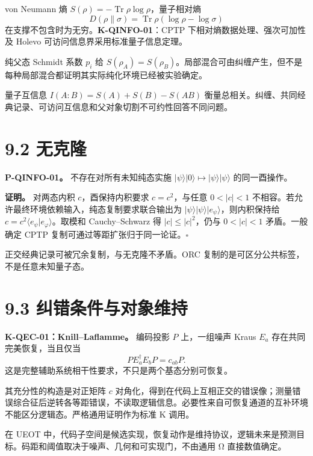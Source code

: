 \documentclass[
  11pt,
  oneside]{book}
\begin{document}
von Neumann 熵 \(S(\rho)=-\operatorname{Tr}\rho\log\rho\)，量子相对熵 \[
D(\rho\|\sigma)=\operatorname{Tr}\rho(\log\rho-\log\sigma)
\] 在支撑不包含时为无穷。\textbf{K-QINFO-01}：CPTP
下相对熵数据处理、强次可加性及 Holevo 可访问信息界采用标准量子信息定理。

纯父态 Schmidt 系数 \(p_i\) 给
\(S(\rho_A)=S(\rho_B)\)。局部混合可由纠缠产生，但不是每种局部混合都证明其实际纯化环境已经被实验确定。

量子互信息 \(I(A:B)=S(A)+S(B)-S(AB)\)
衡量总相关。纠缠、共同经典记录、可访问互信息和父对象切割不可约性回答不同问题。

\hypertarget{ux65e0ux514bux9686}{%
\section{9.2 无克隆}\label{ux65e0ux514bux9686}}

\protect\hypertarget{p-qinfo-01}{}{}

\textbf{P-QINFO-01。} 不存在对所有未知纯态实施
\(|\psi\rangle|0\rangle\mapsto|\psi\rangle|\psi\rangle\) 的同一酉操作。

\textbf{证明。} 对两态内积 \(c\)，酉保持内积要求 \(c=c^2\)，与任意
\(0<|c|<1\) 不相容。若允许最终环境依赖输入，纯态复制要求联合输出为
\(|\psi\rangle|\psi\rangle|e_\psi\rangle\)，则内积保持给
\(c=c^2\langle e_\psi|e_\varphi\rangle\)。取模和 Cauchy--Schwarz 得
\(|c|\le|c|^2\)，仍与 \(0<|c|<1\) 矛盾。一般确定 CPTP
复制可通过等距扩张归于同一论证。\(\square\)

正交经典记录可被冗余复制，与无克隆不矛盾。ORC
复制的是可区分公共标签，不是任意未知量子态。

\hypertarget{ux7ea0ux9519ux6761ux4ef6ux4e0eux5bf9ux8c61ux7ef4ux6301}{%
\section{9.3
纠错条件与对象维持}\label{ux7ea0ux9519ux6761ux4ef6ux4e0eux5bf9ux8c61ux7ef4ux6301}}

\textbf{K-QEC-01：Knill--Laflamme。} 编码投影 \(P\) 上，一组噪声 Kraus
\(E_a\) 存在共同完美恢复，当且仅当 \[
PE_a^\dagger E_bP=c_{ab}P.
\] 这是完整辅助系统相干性要求，不只是两个基态分别可恢复。

其充分性的构造是对正矩阵 \(c\)
对角化，得到在代码上互相正交的错误像；测量错误综合征后逆转各等距错误，不读取逻辑信息。必要性来自可恢复通道的互补环境不能区分逻辑态。严格通用证明作为标准
K 调用。

在 UEOT
中，代码子空间是候选实现，恢复动作是维持协议，逻辑未来是预测目标。码距和阈值取决于噪声、几何和可实现门，不由通用
Ω 直接数值确定。
\end{document}
